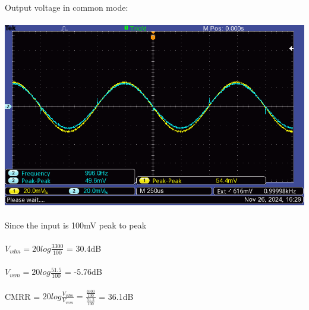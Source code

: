 \documentclass{article}
\begin{document}
\begin{enumerate}
			Output voltage in common mode:\\\\
			\includegraphics[scale=0.5]{7.3.1.3 Collector Vs common/F0000TEK}\\\\
			Since the input is 100mV peak to peak\\\\ \(V_{vdm} = 20 log\frac{3300}{100}\) = 30.4dB\\\\
			\(V_{vcm} = 20 log\frac{51.5}{100}\) = -5.76dB\\\\
			CMRR = \(20log \frac{V_{vdm}}{V_{vcm}} = \frac{\frac{3300}{100}}{\frac{51.5}{100}} \) = 36.1dB\\\\
		\end{enumerate}
		\pagebreak
\end{document}
